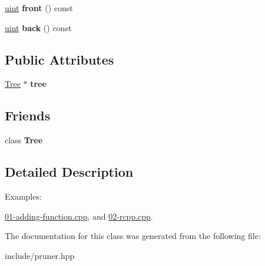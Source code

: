 \begin{DoxyCompactItemize}
\mbox{\label{classpruner_1_1TreeIterator_a37f0905857179d16537e79f5fb163f09}} 
\hyperlink{namespacepruner_a659e6e64a9e2b8e981c3d34262a2f67e}{uint} {\bfseries front} () const
\item 
\mbox{\label{classpruner_1_1TreeIterator_a9f4f8c8adf0f9bd6548f4874869682a1}} 
\hyperlink{namespacepruner_a659e6e64a9e2b8e981c3d34262a2f67e}{uint} {\bfseries back} () const
\end{DoxyCompactItemize}
\subsection*{Public Attributes}
\begin{DoxyCompactItemize}
\item 
\mbox{\label{classpruner_1_1TreeIterator_a4004afb2d477525015da737572007c88}} 
\hyperlink{classpruner_1_1Tree}{Tree} $\ast$ {\bfseries tree}
\end{DoxyCompactItemize}
\subsection*{Friends}
\begin{DoxyCompactItemize}
\item 
\mbox{\label{classpruner_1_1TreeIterator_a4b682814d14447120dd184fd300deade}} 
class {\bfseries Tree}
\end{DoxyCompactItemize}


\subsection{Detailed Description}
\begin{Desc}
\item[Examples\+: ]\par
\hyperlink{01-adding-function_8cpp-example}{01-\/adding-\/function.\+cpp}, and \hyperlink{02-rcpp_8cpp-example}{02-\/rcpp.\+cpp}.\end{Desc}


The documentation for this class was generated from the following file\+:\begin{DoxyCompactItemize}
\item 
include/pruner.\+hpp\end{DoxyCompactItemize}
